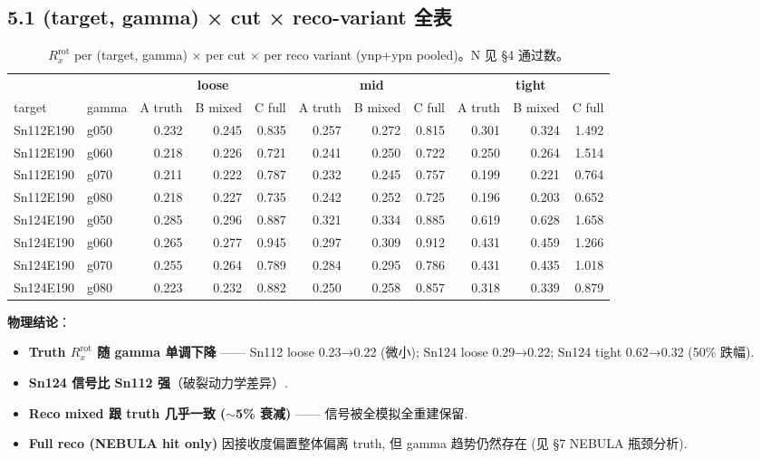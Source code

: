 \documentclass[a4paper,11pt]{article}
\begin{document}
\subsection*{5.1 (target, gamma) × cut × reco-variant 全表}
\begin{table}[H]
\centering\footnotesize
\caption{$R_x^\text{rot}$ per (target, gamma) × per cut × per reco variant (ynp+ypn pooled)。N 见 §4 通过数。}
\begin{tabular}{ll|rrr|rrr|rrr}
\toprule
& & \multicolumn{3}{c|}{\textbf{loose}} & \multicolumn{3}{c|}{\textbf{mid}} & \multicolumn{3}{c}{\textbf{tight}} \\
target & gamma & A truth & B mixed & C full & A truth & B mixed & C full & A truth & B mixed & C full \\
\midrule
Sn112E190 & g050 & 0.232 & 0.245 & 0.835 & 0.257 & 0.272 & 0.815 & 0.301 & 0.324 & 1.492 \\
Sn112E190 & g060 & 0.218 & 0.226 & 0.721 & 0.241 & 0.250 & 0.722 & 0.250 & 0.264 & 1.514 \\
Sn112E190 & g070 & 0.211 & 0.222 & 0.787 & 0.232 & 0.245 & 0.757 & 0.199 & 0.221 & 0.764 \\
Sn112E190 & g080 & 0.218 & 0.227 & 0.735 & 0.242 & 0.252 & 0.725 & 0.196 & 0.203 & 0.652 \\
Sn124E190 & g050 & 0.285 & 0.296 & 0.887 & 0.321 & 0.334 & 0.885 & 0.619 & 0.628 & 1.658 \\
Sn124E190 & g060 & 0.265 & 0.277 & 0.945 & 0.297 & 0.309 & 0.912 & 0.431 & 0.459 & 1.266 \\
Sn124E190 & g070 & 0.255 & 0.264 & 0.789 & 0.284 & 0.295 & 0.786 & 0.431 & 0.435 & 1.018 \\
Sn124E190 & g080 & 0.223 & 0.232 & 0.882 & 0.250 & 0.258 & 0.857 & 0.318 & 0.339 & 0.879 \\
\bottomrule
\end{tabular}
\end{table}

\textbf{物理结论}：
\begin{itemize}[nosep]
\item \textbf{Truth $R_x^\text{rot}$ 随 gamma 单调下降} —— Sn112 loose 0.23→0.22 (微小); Sn124 loose 0.29→0.22; Sn124 tight 0.62→0.32 (50\% 跌幅).
\item \textbf{Sn124 信号比 Sn112 强}（破裂动力学差异）.
\item \textbf{Reco mixed 跟 truth 几乎一致 ($\sim$5\% 衰减)} —— 信号被全模拟全重建保留.
\item \textbf{Full reco (NEBULA hit only)} 因接收度偏置整体偏离 truth, 但 gamma 趋势仍然存在 (见 §7 NEBULA 瓶颈分析).
\end{itemize}
\end{document}
